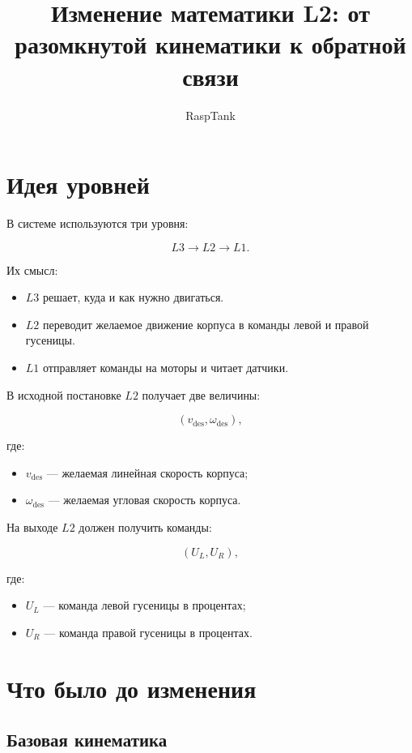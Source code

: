 \documentclass[12pt,a4paper]{article}
\title{Изменение математики L2: от разомкнутой кинематики к обратной связи}
\author{RaspTank}
\date{}
\newcommand{\vdes}{v_{\mathrm{des}}}
\newcommand{\wdes}{\omega_{\mathrm{des}}}
\begin{document}
\maketitle

\section{Идея уровней}

В системе используются три уровня:

\[
L3 \longrightarrow L2 \longrightarrow L1.
\]

Их смысл:

\begin{itemize}
  \item \(L3\) решает, куда и как нужно двигаться.
  \item \(L2\) переводит желаемое движение корпуса в команды левой и правой
  гусеницы.
  \item \(L1\) отправляет команды на моторы и читает датчики.
\end{itemize}

В исходной постановке \(L2\) получает две величины:

\[
(\vdes, \wdes),
\]

где:

\begin{itemize}
  \item \(\vdes\) --- желаемая линейная скорость корпуса;
  \item \(\wdes\) --- желаемая угловая скорость корпуса.
\end{itemize}

На выходе \(L2\) должен получить команды:

\[
(U_L, U_R),
\]

где:

\begin{itemize}
  \item \(U_L\) --- команда левой гусеницы в процентах;
  \item \(U_R\) --- команда правой гусеницы в процентах.
\end{itemize}

\section{Что было до изменения}

\subsection{Базовая кинематика}
\end{document}

